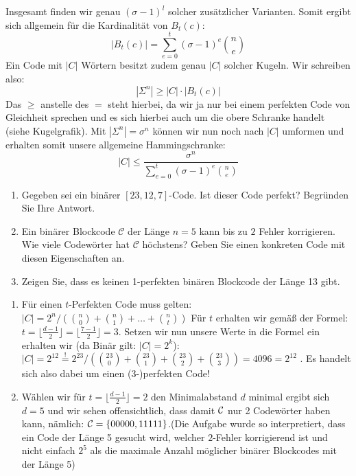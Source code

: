 \begin{aufgabe}
Insgesamt finden wir genau $(\sigma -1)^l$ solcher zusätzlicher Varianten. Somit ergibt sich allgemein für die Kardinalität von $B_t(c)$: $$|B_t(c)| = \sum\limits_{e=0}^t(\sigma-1)^e \binom{n}{e}$$
Ein Code mit $|C|$ Wörtern besitzt zudem genau $|C|$ solcher Kugeln. Wir schreiben also: $$|\Sigma^n| \geq |C|\cdot |B_t(c)|$$
Das $\geq$ anstelle des $=$ steht hierbei, da wir ja nur bei einem perfekten Code von Gleichheit sprechen und es sich hierbei auch um die obere Schranke handelt (siehe Kugelgrafik). Mit $|\Sigma^n| = \sigma^n$ können wir nun noch nach $|C|$ umformen und erhalten somit unsere allgemeine Hammingschranke: 
$$|C| \leq \frac{\sigma^n}{\sum_{e=0}^t(\sigma-1)^e \binom{n}{e}}$$
\end{aufgabe}

\begin{aufgabe}[Perfektion][3]
\vspace{-1\baselineskip}
\begin{enumerate}[label=\alph*)]\narrowitems
\item Gegeben sei ein binärer \([23,12,7]\)-Code. Ist dieser Code perfekt?
        Begründen Sie Ihre Antwort.
\item Ein binärer Blockcode \(\mathcal{C}\) der Länge \(n=5\) kann bis zu \(2\)
        Fehler korrigieren. Wie viele Codewörter hat \(\mathcal{C}\) höchstens?
        Geben Sie einen konkreten Code mit diesen Eigenschaften an.
\item Zeigen Sie, dass es keinen 1-perfekten binären Blockcode der Länge 13 gibt.
\end{enumerate}
\Splitter
\vspace{-1\baselineskip}
\begin{enumerate}[label=\alph*)]\narrowitems
    \item Für einen \(t\)-Perfekten Code muss gelten: \\
          \(|C| = 2^n \Big/ \left(\binom{n}{0} + \binom{n}{1} + \ldots + \binom{n}{t}\right)\) 
          Für \(t\) erhalten wir gemäß der Formel: \(t = \lfloor \frac{d-1}{2} \rfloor = \lfloor \frac{7-1}{2}\rfloor = 3\). Setzen wir nun unsere Werte in die Formel ein erhalten wir (da Binär gilt: \(|C| = 2^k\)): \\
          \(|C| = 2^{12} \overset{!}{=} 2^{23} \Big/ \left(\binom{23}{0} + \binom{23}{1} + \binom{23}{2} + \binom{23}{3}\right) = 4096 = 2^{12}\) . Es handelt sich also dabei um einen (\(3\)-)perfekten Code!
    \item Wählen wir für \(t = \lfloor \frac{d-1}{2} \rfloor = 2\) den Minimalabstand \(d\) minimal ergibt sich \(d=5\) und wir sehen offensichtlich, dass damit \({\cal C}\) nur 2 Codewörter haben kann, nämlich: \({\cal C} = \{00000,11111\}\).(Die Aufgabe wurde so interpretiert, dass ein Code der Länge 5 gesucht wird, welcher \(2\)-Fehler korrigierend ist und nicht einfach \(2^5\) als die maximale Anzahl möglicher binärer Blockcodes mit der Länge 5)

\end{enumerate}
\end{aufgabe}
